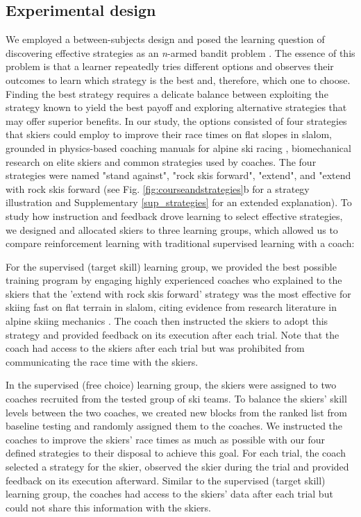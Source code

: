 \documentclass[pdflatex,sn-nature]{sn-jnl}%
\theoremstyle{thmstyleone}%
\theoremstyle{thmstyletwo}%
\theoremstyle{thmstylethree}%
\begin{document}
\subsection{Experimental design}
We employed a between-subjects design and posed the learning question of discovering effective strategies as an \textit{n}-armed bandit problem \cite{sutton_reinforcement_2018}. The essence of this problem is that a learner repeatedly tries different options and observes their outcomes to learn which strategy is the best and, therefore, which one to choose. Finding the best strategy requires a delicate balance between exploiting the strategy known to yield the best payoff and exploring alternative strategies that may offer superior benefits. In our study, the options consisted of four strategies that skiers could employ to improve their race times on flat slopes in slalom, grounded in physics-based coaching manuals for alpine ski racing \cite{lemaster_skiers_1999, lemaster_ultimate_2010, lind_physics_2004, mote_accelerations_1983}, biomechanical research on elite skiers \cite{reid_kinematic_2010, reid_alpine_2020, magelssen_is_2022}  and common strategies used by coaches.  The four strategies were named "stand against", "rock skis forward", "extend", and "extend with rock skis forward (see Fig. \ref{fig:courseandstrategies}b for a strategy illustration and Supplementary \ref{sup_strategies} for an extended explanation). To study how instruction and feedback drove learning to select effective strategies, we designed and allocated skiers to three learning groups, which allowed us to compare reinforcement learning with traditional supervised learning with a coach: 

For the supervised (target skill) learning group, we provided the best possible training program by engaging highly experienced coaches who explained to the skiers that the 'extend with rock skis forward' strategy was the most effective for skiing fast on flat terrain in slalom, citing evidence from research literature in alpine skiing mechanics \cite{reid_kinematic_2010, mote_accelerations_1983, lind_physics_2004}. The coach then instructed the skiers to adopt this strategy and provided feedback on its execution after each trial. Note that the coach had access to the skiers after each trial but was prohibited from communicating the race time with the skiers.

In the supervised (free choice) learning group, the skiers were assigned to two coaches recruited from the tested group of ski teams. To balance the skiers' skill levels between the two coaches, we created new blocks from the ranked list from baseline testing and randomly assigned them to the coaches. We instructed the coaches to improve the skiers' race times as much as possible with our four defined strategies to their disposal to achieve this goal. For each trial, the coach selected a strategy for the skier, observed the skier during the trial and provided feedback on its execution afterward. Similar to the supervised (target skill) learning group, the coaches had access to the skiers' data after each trial but could not share this information with the skiers.
\end{document}
